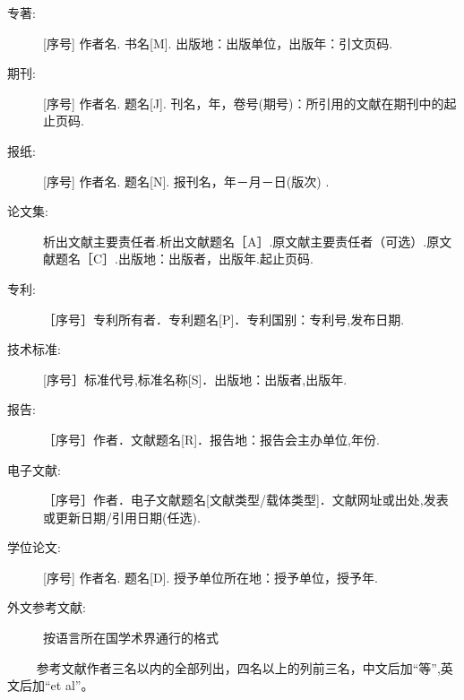 \begin{description}
    \item[专著:] [序号] 作者名. 书名[M]. 出版地：出版单位，出版年：引文页码. 
    \item[期刊:] [序号] 作者名. 题名[J]. 刊名，年，卷号(期号)：所引用的文献在期刊中的起止页码. 
    \item[报纸:] [序号] 作者名. 题名[N]. 报刊名，年－月－日(版次) .
    \item[论文集:] 析出文献主要责任者.析出文献题名［A］.原文献主要责任者（可选）.原文献题名［C］.出版地：出版者，出版年.起止页码.
    \item[专利:] ［序号］专利所有者．专利题名[P]．专利国别：专利号,发布日期.
    \item[技术标准:] [序号］标准代号,标准名称[S]．出版地：出版者,出版年.
    \item[报告:] ［序号］作者．文献题名[R]．报告地：报告会主办单位,年份.
    \item[电子文献:] ［序号］作者．电子文献题名[文献类型/载体类型]．文献网址或出处,发表或更新日期/引用日期(任选). 
    \item[学位论文:] [序号] 作者名. 题名[D]. 授予单位所在地：授予单位，授予年.
    \item[外文参考文献:] 按语言所在国学术界通行的格式
\end{description}
　　
参考文献作者三名以内的全部列出，四名以上的列前三名，中文后加“等”,英文后加“et al”。